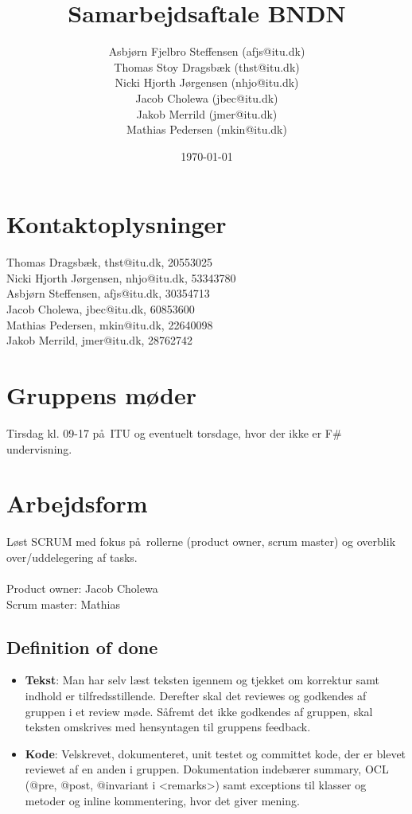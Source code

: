 \documentclass{article}
\title{Samarbejdsaftale BNDN}
\date{\today}
\author{Asbj\o rn Fjelbro Steffensen (afjs@itu.dk)\\ Thomas Stoy Dragsb\ae k (thst@itu.dk)\\ Nicki Hjorth J\o rgensen (nhjo@itu.dk)\\ Jacob Cholewa (jbec@itu.dk)\\ Jakob Merrild (jmer@itu.dk)\\ Mathias Pedersen (mkin@itu.dk)}
\begin{document}
\maketitle
\newpage

\section{Kontaktoplysninger}
Thomas Dragsb\ae k, thst@itu.dk, 20553025 \\
Nicki Hjorth J\o rgensen, nhjo@itu.dk, 53343780 \\
Asbj\o rn Steffensen, afjs@itu.dk, 30354713 \\
Jacob Cholewa, jbec@itu.dk, 60853600 \\
Mathias Pedersen, mkin@itu.dk, 22640098 \\
Jakob Merrild, jmer@itu.dk, 28762742

\section{Gruppens m\o der}
Tirsdag kl. 09-17 p\aa \ ITU og eventuelt torsdage, hvor der ikke er F\# undervisning.

\section{Arbejdsform}
L\o st SCRUM med fokus p\aa \ rollerne (product owner, scrum master) og overblik over/uddelegering af tasks. \\ \\
Product owner: Jacob Cholewa \\
Scrum master: Mathias

\subsection{Definition of done}
\begin{itemize}
\item \textbf{Tekst}: Man har selv l\ae st teksten igennem og tjekket om korrektur samt indhold er tilfredsstillende. Derefter skal det reviewes og godkendes af gruppen i et review m\o de. S\aa fremt det ikke godkendes af gruppen, skal teksten omskrives med hensyntagen til gruppens feedback.
\item \textbf{Kode}: Velskrevet, dokumenteret, unit testet og committet kode, der er blevet reviewet af en anden i gruppen. Dokumentation indeb\ae rer summary, OCL (@pre, @post, @invariant i <remarks>) samt exceptions til klasser og metoder og inline kommentering, hvor det giver mening.
\end{itemize}
\end{document}
